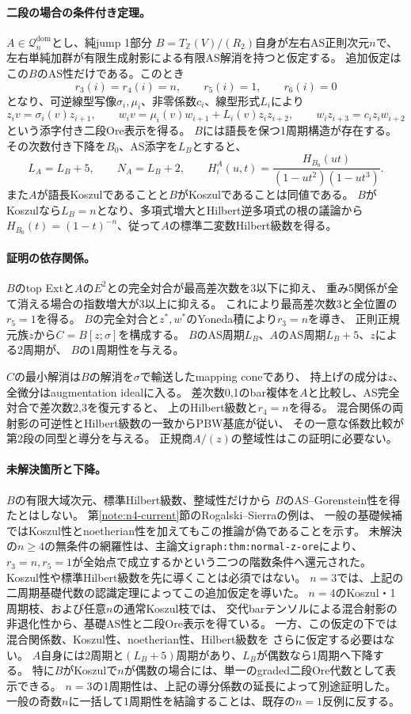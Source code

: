 \documentclass[11pt,a4paper]{ltjsarticle}
\begin{document}
\paragraph{二段の場合の条件付き定理。}
$A\in\mathcal Q_n^{\mathrm{dom}}$とし、純jump 1部分
$B=T_{\mathbb Z}(V)/(R_2)$自身が左右AS正則次元$n$で、
左右単純加群が有限生成射影による有限AS解消を持つと仮定する。
追加仮定はこの$B$のAS性だけである。このとき
\[
r_3(i)=r_4(i)=n,\qquad r_5(i)=1,\qquad r_6(i)=0
\]
となり、可逆線型写像$\sigma_i,\mu_i$、非零係数$c_i$、線型形式$L_i$により
\[
z_i v=\sigma_i(v)z_{i+1},\qquad
w_i v=\mu_i(v)w_{i+1}+L_i(v)z_i z_{i+2},\qquad
w_i z_{i+3}=c_i z_i w_{i+2}
\]
という添字付き二段Ore表示を得る。
$B$には語長を保つ1周期構造が存在する。
その次数付き下降を$B_0$、AS添字を$L_B$とすると、
\[
L_A=L_B+5,\qquad N_A=L_B+2,\qquad
H_i^A(u,t)=\frac{H_{B_0}(ut)}{(1-ut^2)(1-ut^3)}.
\]
また$A$が語長Koszulであることと$B$がKoszulであることは同値である。
$B$がKoszulなら$L_B=n$となり、多項式増大とHilbert逆多項式の根の議論から
$H_{B_0}(t)=(1-t)^{-n}$、従って$A$の標準二変数Hilbert級数を得る。

\paragraph{証明の依存関係。}
$B$のtop Extと$A$の$E^2$との完全対合が最高差次数を3以下に抑え、
重み5関係が全て消える場合の指数増大が3以上に抑える。
これにより最高差次数3と全位置の$r_5=1$を得る。
$B$の完全対合と$z^*,w^*$のYoneda積により$r_3=n$を導き、
正則正規元族$z$から$C=B[z;\sigma]$を構成する。
$B$のAS周期$L_B$、$A$のAS周期$L_B+5$、$z$による2周期が、
$B$の1周期性を与える。

$C$の最小解消は$B$の解消を$\sigma$で輸送したmapping coneであり、
持上げの成分は$z$、全微分はaugmentation idealに入る。
差次数0,1のbar複体を$A$と比較し、AS完全対合で差次数2,3を復元すると、
上のHilbert級数と$r_4=n$を得る。
混合関係の両射影の可逆性とHilbert級数の一致からPBW基底が従い、
その一意な係数比較が第2段の同型と導分を与える。
正規商$A/(z)$の整域性はこの証明に必要ない。

\paragraph{未解決箇所と下降。}
$B$の有限大域次元、標準Hilbert級数、整域性だけから
$B$のAS--Gorenstein性を得たとはしない。
第\ref{note:n4-current}節のRogalski--Sierraの例は、
一般の基礎候補ではKoszul性とnoetherian性を加えてもこの推論が偽であることを示す。
未解決の$n\geq4$の無条件の網羅性は、主論文\texttt{igraph:thm:normal-z-ore}により、
$r_3=n,r_5=1$が全始点で成立するかという二つの階数条件へ還元された。
Koszul性や標準Hilbert級数を先に導くことは必須ではない。
$n=3$では、上記の二周期基礎代数の認識定理によってこの追加仮定を導いた。
$n=4$のKoszul・1周期枝、および任意$n$の通常Koszul枝では、
交代barテンソルによる混合射影の非退化性から、基礎AS性と二段Ore表示を得ている。
一方、この仮定の下では混合関係数、Koszul性、noetherian性、Hilbert級数を
さらに仮定する必要はない。
$A$自身には2周期と$(L_B+5)$周期があり、$L_B$が偶数なら1周期へ下降する。
特に$B$がKoszulで$n$が偶数の場合には、単一のgraded二段Ore代数として表示できる。
$n=3$の1周期性は、上記の導分係数の延長によって別途証明した。
一般の奇数$n$に一括して1周期性を結論することは、既存の$n=1$反例に反する。
\end{document}
